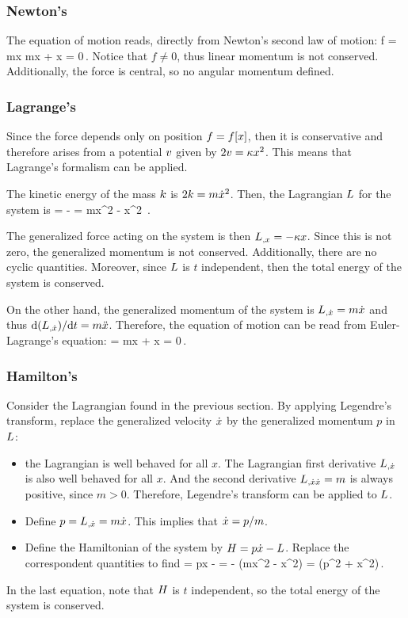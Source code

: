 \subsubsection{Newton's}
The equation of motion reads, directly from Newton's second law of motion:
\beq
f = m\ddt x \implies m\ddt x + \kappa x = 0\,.
\eeq
Notice that $f\neq 0$, thus linear momentum is not conserved. Additionally, the force is central, so no angular momentum defined.


\subsubsection{Lagrange's}
Since the force depends only on position $f = f\!\left[{x}\right]$, then it is conservative and therefore arises from a potential $v$ given by $2v = \kappa x^2$. This means that Lagrange's formalism can be applied. 

The kinetic energy of the mass $k$ is $2k = m\dot{x}^2$. Then, the Lagrangian $L$ for the system is
\beq
\lag = \ken - \pen = m\dt x^2 - \kappa x^2 \,.
\eeq

The generalized force acting on the system is then ${L}_{,{x}} = -\kappa x$. Since this is not zero, the generalized momentum is not conserved. Additionally, there are no cyclic quantities. Moreover, since $L$ is $t$ independent, then the total energy of the system is conserved.

On the other hand, the generalized momentum of the system is ${L}_{,{\dot{x}}} = m\dot{x}$ and thus $\text{d}({L}_{,{\dot{x}}})/\text{d} t = m\ddot{x}$. Therefore, the equation of motion can be read from Euler-Lagrange's equation:
\beq
{} = m\ddt x + \kappa x = 0\,.
\eeq


\subsubsection{Hamilton's}
Consider the Lagrangian found in the previous section. By applying Legendre's transform, replace the generalized velocity $\dot{x}$ by the generalized momentum $p$ in $L$:
\begin{itemize}
\item the Lagrangian is well behaved for all $x$. The Lagrangian first derivative ${L}_{,{\dot{x}}}$ is also well behaved for all $x$. And the second derivative ${L}_{,{\dot{x}\dot{x}}} = m$ is always positive, since $m > 0$. Therefore, Legendre's transform can be applied to $L$.
%
\item Define $p = {L}_{,{\dot{x}}} = m\dot{x}$. This implies that $\dot{x} = p/m$.
%
\item Define the Hamiltonian of the system by $H = p\dot{x} - L$. Replace the correspondent quantities to find
\beq
\ham = p\dt x - \lag 
     =  - \left(m\dt x^2 - \kappa x^2\right)
     = \left(p^2 + \kappa x^2\right)\,.
\eeq
%
\end{itemize}
In the last equation, note that $H$ is $t$ independent, so the total energy of the system is conserved.

